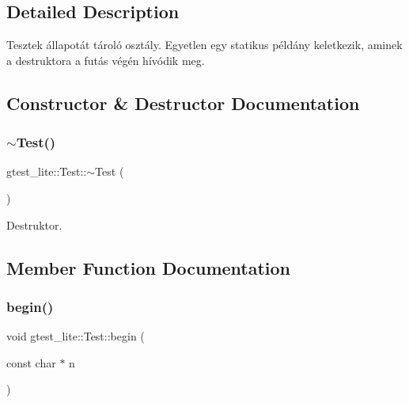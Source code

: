 \subsection{Detailed Description}
Tesztek állapotát tároló osztály. Egyetlen egy statikus példány keletkezik, aminek a destruktora a futás végén hívódik meg. 

\subsection{Constructor \& Destructor Documentation}
\mbox{\label{structgtest__lite_1_1_test_a5a879233c2aa110626668c06140f6e71}} 
\subsubsection{\texorpdfstring{$\sim$Test()}{~Test()}}
{\footnotesize\ttfamily gtest\+\_\+lite\+::\+Test\+::$\sim$\+Test (\begin{DoxyParamCaption}{ }\end{DoxyParamCaption})\hspace{0.3cm}{\ttfamily [inline]}}



Destruktor. 



\subsection{Member Function Documentation}
\mbox{\label{structgtest__lite_1_1_test_a2227b70fcc5dfb3c326bf117dd8f7e79}} 
\subsubsection{\texorpdfstring{begin()}{begin()}}
{\footnotesize\ttfamily void gtest\+\_\+lite\+::\+Test\+::begin (\begin{DoxyParamCaption}\item[{const char $\ast$}]{n }\end{DoxyParamCaption})\hspace{0.3cm}{\ttfamily [inline]}}



